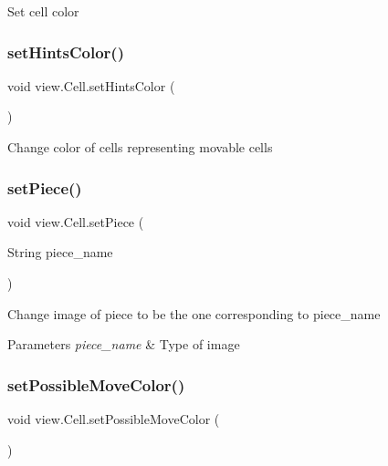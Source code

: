 Set cell color \mbox{\label{classview_1_1_cell_a4e042931877eaab67434d38117c21a56}} 
\subsubsection{\texorpdfstring{setHintsColor()}{setHintsColor()}}
{\footnotesize\ttfamily void view.\+Cell.\+set\+Hints\+Color (\begin{DoxyParamCaption}{ }\end{DoxyParamCaption})\hspace{0.3cm}{\ttfamily [inline]}}

Change color of cells representing movable cells \mbox{\label{classview_1_1_cell_af2cf8437eb1b84d7dffcc31aceaadf49}} 
\subsubsection{\texorpdfstring{setPiece()}{setPiece()}}
{\footnotesize\ttfamily void view.\+Cell.\+set\+Piece (\begin{DoxyParamCaption}\item[{String}]{piece\+\_\+name }\end{DoxyParamCaption})\hspace{0.3cm}{\ttfamily [inline]}}

Change image of piece to be the one corresponding to piece\+\_\+name


\begin{DoxyParams}{Parameters}
{\em piece\+\_\+name} & Type of image \\
\hline
\end{DoxyParams}
\mbox{\label{classview_1_1_cell_a137e09b0f767a45cc7dfb00b538adf33}} 
\subsubsection{\texorpdfstring{setPossibleMoveColor()}{setPossibleMoveColor()}}
{\footnotesize\ttfamily void view.\+Cell.\+set\+Possible\+Move\+Color (\begin{DoxyParamCaption}{ }\end{DoxyParamCaption})\hspace{0.3cm}{\ttfamily [inline]}}

